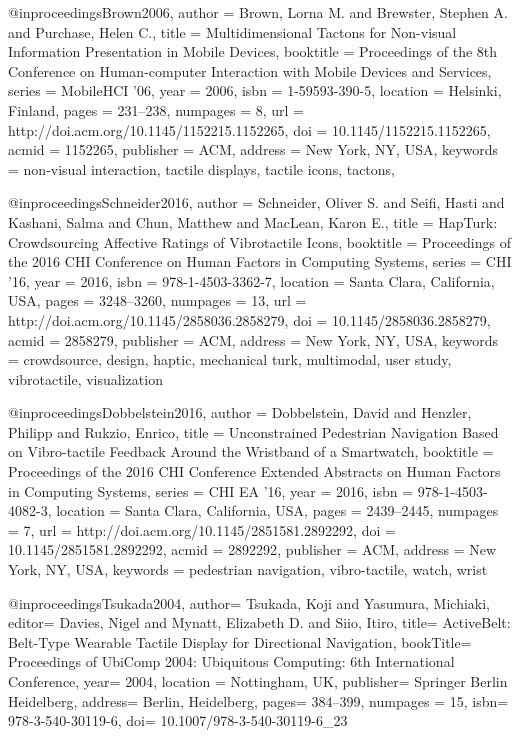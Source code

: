 @inproceedings{Brown2006,
 author = {Brown, Lorna M. and Brewster, Stephen A. and Purchase, Helen C.},
 title = {{Multidimensional Tactons for Non-visual Information Presentation in Mobile Devices}},
 booktitle = {Proceedings of the 8th Conference on Human-computer Interaction with Mobile Devices and Services},
 series = {MobileHCI '06},
 year = {2006},
 isbn = {1-59593-390-5},
 location = {Helsinki, Finland},
 pages = {231--238},
 numpages = {8},
 url = {http://doi.acm.org/10.1145/1152215.1152265},
 doi = {10.1145/1152215.1152265},
 acmid = {1152265},
 publisher = {ACM},
 address = {New York, NY, USA},
 keywords = {non-visual interaction, tactile displays, tactile icons, tactons},
} 

@inproceedings{Schneider2016,
 author = {Schneider, Oliver S. and Seifi, Hasti and Kashani, Salma and Chun, Matthew and MacLean, Karon E.},
 title = {{HapTurk: Crowdsourcing Affective Ratings of Vibrotactile Icons}},
 booktitle = {Proceedings of the 2016 CHI Conference on Human Factors in Computing Systems},
 series = {CHI '16},
 year = {2016},
 isbn = {978-1-4503-3362-7},
 location = {Santa Clara, California, USA},
 pages = {3248--3260},
 numpages = {13},
 url = {http://doi.acm.org/10.1145/2858036.2858279},
 doi = {10.1145/2858036.2858279},
 acmid = {2858279},
 publisher = {ACM},
 address = {New York, NY, USA},
 keywords = {crowdsource, design, haptic, mechanical turk, multimodal, user study, vibrotactile, visualization}
} 

@inproceedings{Dobbelstein2016,
 author = {Dobbelstein, David and Henzler, Philipp and Rukzio, Enrico},
 title = {{Unconstrained Pedestrian Navigation Based on Vibro-tactile Feedback Around the Wristband of a Smartwatch}},
 booktitle = {Proceedings of the 2016 CHI Conference Extended Abstracts on Human Factors in Computing Systems},
 series = {CHI EA '16},
 year = {2016},
 isbn = {978-1-4503-4082-3},
 location = {Santa Clara, California, USA},
 pages = {2439--2445},
 numpages = {7},
 url = {http://doi.acm.org/10.1145/2851581.2892292},
 doi = {10.1145/2851581.2892292},
 acmid = {2892292},
 publisher = {ACM},
 address = {New York, NY, USA},
 keywords = {pedestrian navigation, vibro-tactile, watch, wrist}
} 

@inproceedings{Tsukada2004,
author= {Tsukada, Koji and Yasumura, Michiaki},
editor= {Davies, Nigel and Mynatt, Elizabeth D. and Siio, Itiro},
title= {{ActiveBelt: Belt-Type Wearable Tactile Display for Directional Navigation}},
bookTitle= { Proceedings of UbiComp 2004: Ubiquitous Computing: 6th International Conference},
year= {2004},
location = {Nottingham, UK},
publisher= {Springer Berlin Heidelberg},
address= {Berlin, Heidelberg},
pages= {384--399},
numpages = {15},
isbn= {978-3-540-30119-6},
doi= {10.1007/978-3-540-30119-6_23}
}